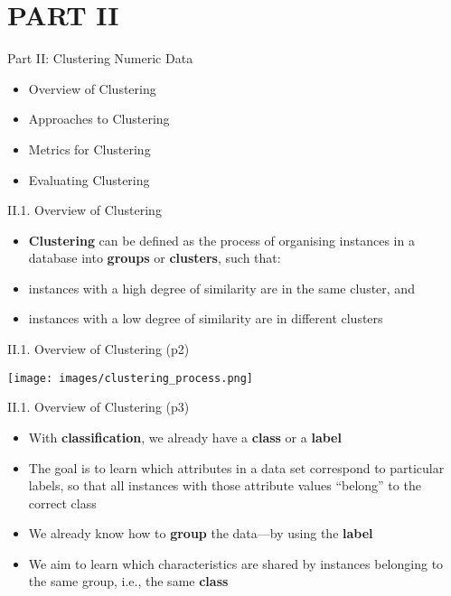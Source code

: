 \documentclass[handout]{beamer}
\newcommand{\strong}[1]{\textbf{\color{teal} #1}}
\newcommand{\stronger}[1]{\textbf{\color{purple} #1}}
\begin{document}
\section{PART II}
\begin{frame}{Part II: Clustering Numeric Data}
\begin{itemize}
\item[II.1] Overview of Clustering
\item[II.2] Approaches to Clustering
\item[II.3] Metrics for Clustering
\item[II.4] Evaluating Clustering
\end{itemize}
\end{frame}
\begin{frame}{II.1. Overview of Clustering}
\begin{itemize}
\item \stronger{Clustering} can be defined as the process of organising instances in a database into \strong{groups} or \stronger{clusters}, such that:
\item[--] instances with a high degree of similarity are in the same cluster, and
\item[--] instances with a low degree of similarity are in different clusters
\end{itemize}
\end{frame}
\begin{frame}{II.1. Overview of Clustering (p2)}
\begin{center}
\texttt{[image: images/clustering\_process.png]}
\end{center}
\end{frame}
\begin{frame}{II.1. Overview of Clustering (p3)}
\begin{itemize}
\item With \strong{classification}, we already have a \strong{class} or a \strong{label}
\item The goal is to learn which attributes in a data set correspond to particular labels, so that all instances with those attribute values ``belong'' to the correct class
\item We already know how to \strong{group} the data---by using the \strong{label}
\item We aim to learn which characteristics are shared by instances belonging to the same group, i.e., the same \strong{class}
\end{itemize}
\end{frame}
\end{document}
